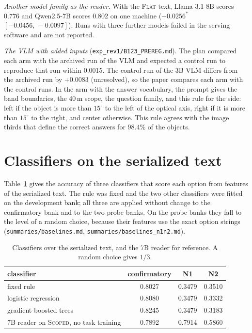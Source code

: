 \documentclass[10pt]{article}
\renewcommand{\thetable}{S\arabic{table}}
\newcommand{\settab}[1]{\setcounter{table}{#1}\addtocounter{table}{-1}\renewcommand{\thetable}{S\arabic{table}}}
\begin{document}
\emph{Another model family as the reader.} With the \textsc{Flat} text, Llama-3.1-8B scores $0.776$ and Qwen2.5-7B scores $0.802$ on one machine ($-0.0256^{*}$ $[-0.0456,\,-0.0097]$). Runs with three further models failed in the serving software and are not reported.

\emph{The VLM with added inputs} (\texttt{exp\_rev1/B123\_PREREG.md}). The plan compared each arm with the archived run of the VLM and expected a control run to reproduce that run within $0.0015$. The control run of the 3B VLM differs from the archived run by $+0.0083$ (unresolved), so the paper compares each arm with the control runs. In the arm with the answer vocabulary, the prompt gives the band boundaries, the 40\,m scope, the question family, and this rule for the side: left if the object is more than $15^\circ$ to the left of the optical axis, right if it is more than $15^\circ$ to the right, and center otherwise. This rule agrees with the image thirds that define the correct answers for $98.4\%$ of the objects.

\section{Classifiers on the serialized text}
Table~\ref{tab:s4} gives the accuracy of three classifiers that score each option from features of the serialized text. The rule was fixed and the two other classifiers were fitted on the development bank; all three are applied without change to the confirmatory bank and to the two probe banks. On the probe banks they fall to the level of a random choice, because their features use the exact option strings (\texttt{summaries/baselines.md}, \texttt{summaries/baselines\_n1n2.md}).
\settab{4}\begin{table}[h]\centering\footnotesize
\caption{Classifiers over the serialized text, and the 7B reader for reference. A random choice gives $1/3$.}\label{tab:s4}
\begin{tabular}{@{}lccc@{}}
\toprule classifier & confirmatory & N1 & N2 \\ \midrule
fixed rule & 0.8027 & 0.3479 & 0.3510 \\
logistic regression & 0.8080 & 0.3479 & 0.3332 \\
gradient-boosted trees & 0.8245 & 0.3479 & 0.3183 \\ \midrule
7B reader on \textsc{Scoped}, no task training & 0.7892 & 0.7914 & 0.5860 \\
\bottomrule
\end{tabular}
\end{table}
\end{document}
